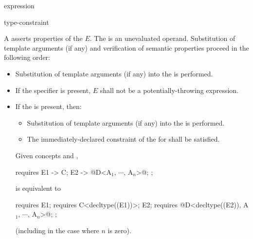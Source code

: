 \begin{bnf}
\br
    \terminal{\{} expression \terminal{\}}   \terminal{;}
\end{bnf}

\begin{bnf}
\br
    \terminal{->} type-constraint
\end{bnf}

\pnum
A  asserts properties
of the  $E$.
The  is an unevaluated operand.
Substitution
of template arguments (if any) and verification of
semantic properties proceed in the following order:

\begin{itemize}
\item
Substitution of template arguments (if any)
into the  is performed.

\item
If the  specifier is present,
$E$ shall not be a potentially-throwing expression.

\item
If the  is present, then:

\begin{itemize}
\item
Substitution of template arguments (if any)
into the  is performed.

\item
The immediately-declared constraint
of the  for 
shall be satisfied.
\end{itemize}
\begin{example}
Given concepts  and ,
\begin{codeblock}
requires {
  { E1 } -> C;
  { E2 } -> @D<A$_1$, $\cdots$, A$_n$>@;
};
\end{codeblock}
is equivalent to
\begin{codeblock}
requires {
  E1; requires C<decltype((E1))>;
  E2; requires @D<decltype((E2)), A$_1$, $\cdots$, A$_n$>@;
};
\end{codeblock}
(including in the case where $n$ is zero).
\end{example}
\end{itemize}
\pnum
